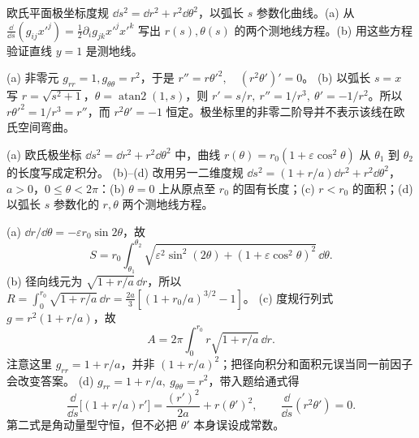 \begin{exercise}
欧氏平面极坐标度规 $\dd s^2=\dd r^2+r^2\dd\theta^2$，以弧长 $s$ 参数化曲线。(a) 从
$\frac{\dd}{\dd s}(g_{ij}x'^j)=\frac12\partial_i g_{jk}x'^jx'^k$
写出 $r(s),\theta(s)$ 的两个测地线方程。(b) 用这些方程验证直线 $y=1$ 是测地线。
\end{exercise}
\begin{solution}
(a) 非零元 $g_{rr}=1,g_{\theta\theta}=r^2$，于是
$r''=r\theta'^2,\quad (r^2\theta')'=0$。
(b) 以弧长 $s=x$ 写 $r=\sqrt{s^2+1}$，$\theta=\operatorname{atan2}(1,s)$，则
$r'=s/r,\ r''=1/r^3,\ \theta'=-1/r^2$。所以 $r\theta'^2=1/r^3=r''$，而 $r^2\theta'=-1$ 恒定。极坐标里的非零二阶导并不表示该线在欧氏空间弯曲。
\end{solution}

\begin{exercise}
(a) 欧氏极坐标 $\dd s^2=\dd r^2+r^2\dd\theta^2$ 中，曲线 $r(\theta)=r_0(1+\varepsilon\cos^2\theta)$ 从 $\theta_1$ 到 $\theta_2$ 的长度写成定积分。
(b)--(d) 改用另一二维度规
$\dd s^2=(1+r/a)\dd r^2+r^2\dd\theta^2$，
$a>0$，$0\le\theta<2\pi$：(b) $\theta=0$ 上从原点至 $r_0$ 的固有长度；(c) $r<r_0$ 的面积；(d) 以弧长 $s$ 参数化的 $r,\theta$ 两个测地线方程。
\end{exercise}
\begin{solution}
(a) $\dd r/\dd\theta=-\varepsilon r_0\sin2\theta$，故
\[
S=r_0\int_{\theta_1}^{\theta_2}
\sqrt{\varepsilon^2\sin^2(2\theta)+(1+\varepsilon\cos^2\theta)^2}\,\dd\theta .
\]
(b) 径向线元为 $\sqrt{1+r/a}\,\dd r$，所以
$R=\int_0^{r_0}\sqrt{1+r/a}\,\dd r
=\frac{2a}{3}[(1+r_0/a)^{3/2}-1]$。
(c) 度规行列式 $g=r^2(1+r/a)$，故
\[
A=2\pi\int_0^{r_0}r\sqrt{1+r/a}\,\dd r .
\]
注意这里 $g_{rr}=1+r/a$，并非 $(1+r/a)^2$；把径向积分和面积元误当同一前因子会改变答案。
(d) $g_{rr}=1+r/a,\ g_{\theta\theta}=r^2$，带入题给通式得
\[
\frac{\dd}{\dd s}\bigl[(1+r/a)r'\bigr]
=\frac{(r')^2}{2a}+r(\theta')^2,\qquad
\frac{\dd}{\dd s}(r^2\theta')=0.
\]
第二式是角动量型守恒，但不必把 $\theta'$ 本身误设成常数。
\end{solution}

